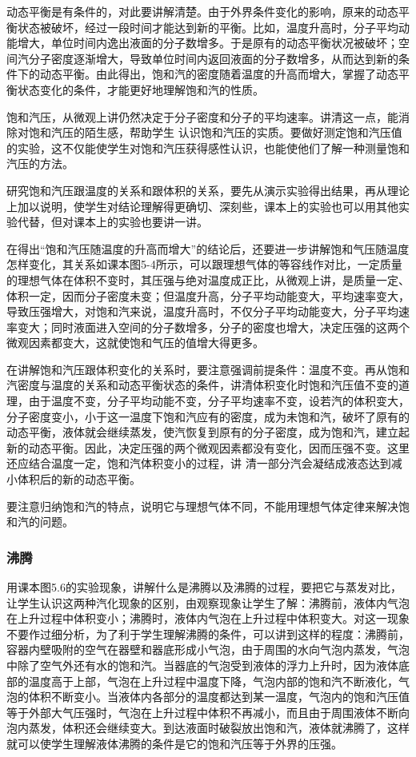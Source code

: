动态平衡是有条件的，对此要讲解清楚。由于外界条件变化的影响，原来的动态平衡状态被破坏，经过一段时间才能达到新的平衡。比如，温度升高时，分子平均动能增大，单位时间内逸出液面的分子数增多。于是原有的动态平衡状况被破坏；空间汽分子密度逐渐增大，导致单位时间内返回液面的分子数增多，从而达到新的条件下的动态平衡。由此得出，饱和汽的密度随着温度的升高而增大，掌握了动态平衡状态变化的条件，才能更好地理解饱和汽的性质。

饱和汽压，从微观上讲仍然决定于分子密度和分子的平均速率。讲清这一点，能消除对饱和汽压的陌生感，帮助学生
认识饱和汽压的实质。要做好测定饱和汽压值的实验，这不仅能使学生对饱和汽压获得感性认识，也能使他们了解一种测量饱和汽压的方法。

研究饱和汽压跟温度的关系和跟体积的关系，要先从演示实验得出结果，再从理论上加以说明，使学生对结论理解得更确切、深刻些，课本上的实验也可以用其他实验代替，但对课本上的实验也要讲一讲。

在得出“饱和汽压随温度的升高而增大”的结论后，还要进一步讲解饱和气压随温度怎样变化，其关系如课本图5-4所示，可以跟理想气体的等容线作对比，一定质量的理想气体在体积不变时，其压强与绝对温度成正比，从微观上讲，是质量一定、体积一定，因而分子密度未变；但温度升高，分子平均动能变大，平均速率变大，导致压强增大，对饱和汽来说，温度升高时，不仅分子平均动能变大，分子平均速率变大；同时液面进入空间的分子数增多，分子的密度也增大，决定压强的这两个微观因素都变大，这就使饱和气压的值增大得更多。

在讲解饱和汽压跟体积变化的关系时，要注意强调前提条件：温度不变。再从饱和汽密度与温度的关系和动态平衡状态的条件，讲清体积变化时饱和汽压值不变的道理，由于温度不变，分子平均动能不变，分子平均速率不变，设若汽的体积变大，分子密度变小，小于这一温度下饱和汽应有的密度，成为未饱和汽，破坏了原有的动态平衡，液体就会继续蒸发，使汽恢复到原有的分子密度，成为饱和汽，建立起新的动态平衡。因此，决定压强的两个微观因素都没有变化，因而压强不变。这里还应结合温度一定，饱和汽体积变小的过程，讲
清一部分汽会凝结成液态达到减小体积后的新的动态平衡。

要注意归纳饱和汽的特点，说明它与理想气体不同，不能用理想气体定律来解决饱和汽的问题。

\subsubsection{沸腾}

用课本图5.6的实验现象，讲解什么是沸腾以及沸腾的过程，要把它与蒸发对比，让学生认识这两种汽化现象的区别，由观察现象让学生了解：沸腾前，液体内气泡在上升过程中体积变小；沸腾时，液体内气泡在上升过程中体积变大。对这一现象不要作过细分析，为了利于学生理解沸腾的条件，可以讲到这样的程度：沸腾前，容器内壁吸附的空气在器壁和器底形成小气泡，由于周围的水向气泡内蒸发，气泡中除了空气外还有水的饱和汽。当器底的气泡受到液体的浮力上升时，因为液体底部的温度高于上部，气泡在上升过程中温度下降，气泡内部的饱和汽不断液化，气泡的体积不断变小。当液体内各部分的温度都达到某一温度，气泡内的饱和汽压值等于外部大气压强时，气泡在上升过程中体积不再减小，而且由于周围液体不断向泡内蒸发，体积还会继续变大。到达液面时破裂放出饱和汽，液体就沸腾了，这样就可以使学生理解液体沸腾的条件是它的饱和汽压等于外界的压强。

